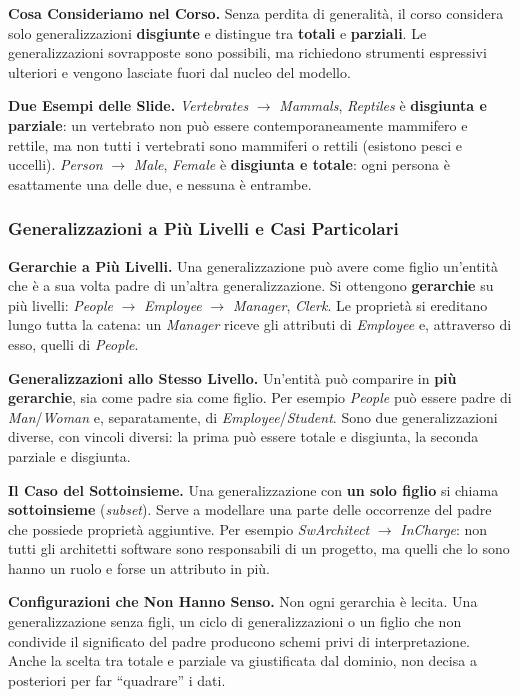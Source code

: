 \documentclass[12pt]{extarticle}
\begin{document}
\medskip
\noindent \textbf{Cosa Consideriamo nel Corso.} Senza perdita di generalità, il corso considera solo generalizzazioni \textbf{disgiunte} e distingue tra \textbf{totali} e \textbf{parziali}. Le generalizzazioni sovrapposte sono possibili, ma richiedono strumenti espressivi ulteriori e vengono lasciate fuori dal nucleo del modello.

\medskip
\noindent \textbf{Due Esempi delle Slide.} \textit{Vertebrates} $\to$ \textit{Mammals}, \textit{Reptiles} è \textbf{disgiunta e parziale}: un vertebrato non può essere contemporaneamente mammifero e rettile, ma non tutti i vertebrati sono mammiferi o rettili (esistono pesci e uccelli). \textit{Person} $\to$ \textit{Male}, \textit{Female} è \textbf{disgiunta e totale}: ogni persona è esattamente una delle due, e nessuna è entrambe.

\subsubsection{Generalizzazioni a Più Livelli e Casi Particolari}

\noindent \textbf{Gerarchie a Più Livelli.} Una generalizzazione può avere come figlio un'entità che è a sua volta padre di un'altra generalizzazione. Si ottengono \textbf{gerarchie} su più livelli: \textit{People} $\to$ \textit{Employee} $\to$ \textit{Manager}, \textit{Clerk}. Le proprietà si ereditano lungo tutta la catena: un \textit{Manager} riceve gli attributi di \textit{Employee} e, attraverso di esso, quelli di \textit{People}.

\medskip
\noindent \textbf{Generalizzazioni allo Stesso Livello.} Un'entità può comparire in \textbf{più gerarchie}, sia come padre sia come figlio. Per esempio \textit{People} può essere padre di \textit{Man}/\textit{Woman} e, separatamente, di \textit{Employee}/\textit{Student}. Sono due generalizzazioni diverse, con vincoli diversi: la prima può essere totale e disgiunta, la seconda parziale e disgiunta.

\medskip
\noindent \textbf{Il Caso del Sottoinsieme.} Una generalizzazione con \textbf{un solo figlio} si chiama \textbf{sottoinsieme} (\textit{subset}). Serve a modellare una parte delle occorrenze del padre che possiede proprietà aggiuntive. Per esempio \textit{SwArchitect} $\to$ \textit{InCharge}: non tutti gli architetti software sono responsabili di un progetto, ma quelli che lo sono hanno un ruolo e forse un attributo in più.

\medskip
\noindent \textbf{Configurazioni che Non Hanno Senso.} Non ogni gerarchia è lecita. Una generalizzazione senza figli, un ciclo di generalizzazioni o un figlio che non condivide il significato del padre producono schemi privi di interpretazione. Anche la scelta tra totale e parziale va giustificata dal dominio, non decisa a posteriori per far ``quadrare'' i dati.
\end{document}
